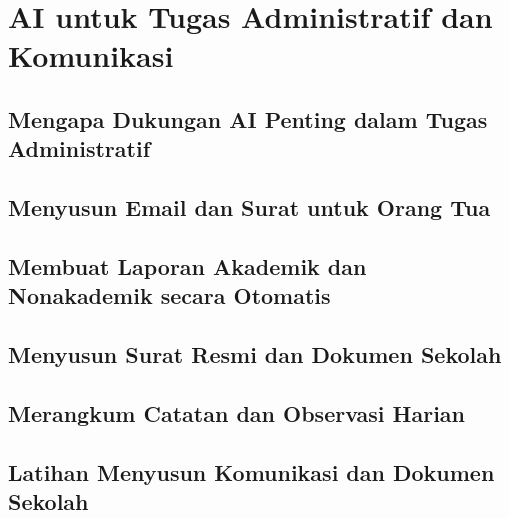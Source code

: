 \chapter{AI untuk Tugas Administratif dan Komunikasi}

\section{Mengapa Dukungan AI Penting dalam Tugas Administratif}

\section{Menyusun Email dan Surat untuk Orang Tua}

\section{Membuat Laporan Akademik dan Nonakademik secara Otomatis}

\section{Menyusun Surat Resmi dan Dokumen Sekolah}

\section{Merangkum Catatan dan Observasi Harian}

\section{Latihan Menyusun Komunikasi dan Dokumen Sekolah}

